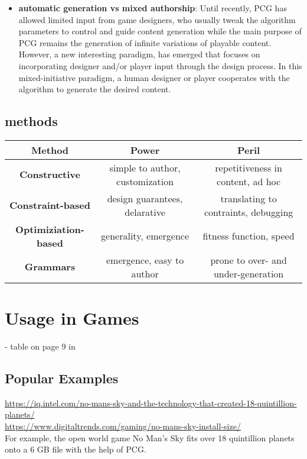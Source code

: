 \documentclass[MGS,Master,english]{twbook}%
\begin{document}
\begin{itemize}
	\item \textbf{automatic generation vs mixed authorship}: Until recently, PCG has allowed limited input from game designers, who usually tweak the algorithm parameters to control and guide content generation while the main purpose of PCG remains the generation of infinite variations of playable content. However, a new interesting paradigm, has emerged that focuses on incorporating designer and/or player input through the design process. In this mixed-initiative paradigm, a human designer or player cooperates with the algorithm to generate the desired content.
\end{itemize}
\subsection{methods}
\begin{tabular}{|c||c|c|}
	\hline 
	\textbf{Method} & \textbf{Power} & \textbf{Peril} \\ 
	\hline \hline 
	\textbf{Constructive} & simple to author, customization & repetitiveness in content, ad hoc \\ 
	\hline 
	\textbf{Constraint-based} & design guarantees, delarative & translating to contraints, debugging \\ 
	\hline 
	\textbf{Optimiziation-based} & generality, emergence & fitness function, speed \\ 
	\hline 
	\textbf{Grammars} & emergence, easy to author & prone to over- and under-generation \\ 
	\hline 
\end{tabular} 



\section{Usage in Games}
- table on page 9 in \cite{pcg::shortHistoryOfDynamicAndPCG}\\

\subsection{Popular Examples}
\url{https://iq.intel.com/no-mans-sky-and-the-technology-that-created-18-quintillion-planets/}\\
\url{https://www.digitaltrends.com/gaming/no-mans-sky-install-size/}\\
For example, the open world game No Man's Sky fits over 18 quintillion planets onto a 6 \ac{GB} file with the help of \ac{PCG}.
\end{document}

